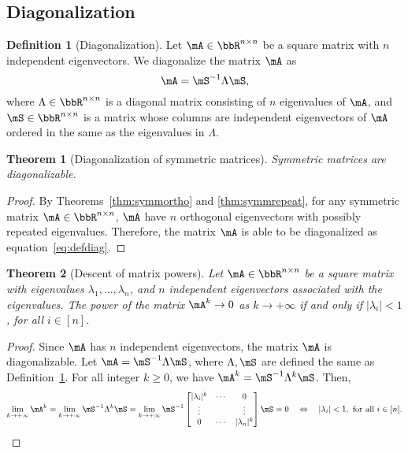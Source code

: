 \documentclass[11pt]{article}
\theoremstyle{plain}
\newtheorem{thm}{Theorem}[section]
\theoremstyle{definition}
\newtheorem{defn}{Definition}
\begin{document}
\subsection{Diagonalization}

\begin{defn}[Diagonalization]\label{def:diagonalization}
	Let  $\mA \in \bbR^{n \times n}$ be a square matrix with $n$ independent eigenvectors. We diagonalize the matrix $\mA$ as
	\begin{equation}\label{eq:defdiag}
		\mA = \mS^{-1} \Lambda \mS,
	\end{equation}
	where $\Lambda \in \bbR^{n \times n}$ is a diagonal matrix consisting of $n$ eigenvalues of $\mA$, and  $\mS \in \bbR^{n \times n}$ is a matrix whose columns are independent eigenvectors of $\mA$ ordered in the same as the eigenvalues in $\Lambda$.
\end{defn}

\begin{thm}[Diagonalization of symmetric matrices]
Symmetric matrices are diagonalizable.
\end{thm}

\begin{proof}
	By Theorems~\ref{thm:symmortho} and \ref{thm:symmrepeat}, for any symmetric matrix $\mA \in \bbR^{n \times n}$, $\mA$ have $n$ orthogonal eigenvectors with possibly repeated eigenvalues. Therefore, the matrix $\mA$   is able to be diagonalized as equation~\eqref{eq:defdiag}.
\end{proof}

\begin{thm}[Descent of matrix powers]
	Let $\mA \in \bbR^{n \times n}$ be  a square matrix with eigenvalues $\lambda_1,...,\lambda_n$, and  $n$ independent eigenvectors associated with the eigenvalues. The power of the matrix $\mA^k \rightarrow 0$ as $k \rightarrow +\infty$ if and only if $|\lambda_i| < 1$, for all $i \in [n]$.
\end{thm}

\begin{proof}
Since $\mA$ has $n$ independent eigenvectors, the matrix $\mA$ is diagonalizable.
	Let $\mA =\mS^{-1} \Lambda \mS$, where $\Lambda, \mS$ are defined the same as Definition~\ref{def:diagonalization}. For all integer $k\geq 0$, we have $\mA^k = \mS^{-1} \Lambda^{k} \mS$. Then,
	\[ \lim_{k \rightarrow +\infty} \mA^k = \lim_{k \rightarrow +\infty} \mS^{-1} \Lambda^{k} \mS  =  \lim_{k \rightarrow +\infty} \mS^{-1} \begin{bmatrix}
		|\lambda_i|^k & \cdots &0\\
		\vdots & &\vdots\\
		0 & \cdots & |\lambda_n|^k
	\end{bmatrix} \mS  = 0 \quad \Leftrightarrow \quad  |\lambda_i| < 1, \text{ for all } i \in [n]. \]
\end{proof}
\end{document}

